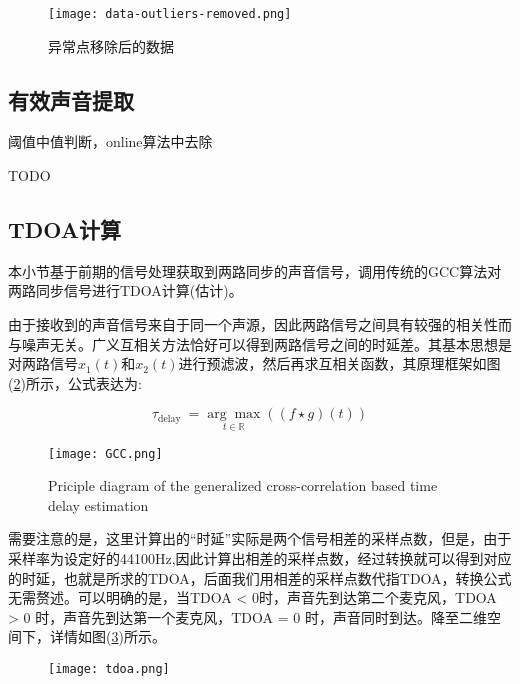 \documentclass[winfonts]{njuthesis}
\begin{document}
			\begin{figure}[H]
				\centering
				\texttt{[image: data-outliers-removed.png]} 
				\caption{异常点移除后的数据}
				\label{fig: data-outliers-removed}
			\end{figure}
		
		\subsection{有效声音提取}
		
			阈值中值判断，online算法中去除 
		
			TODO
		
		\subsection{TDOA计算}
			
			本小节基于前期的信号处理获取到两路同步的声音信号，调用传统的GCC算法对两路同步信号进行TDOA计算(估计)。
			
			由于接收到的声音信号来自于同一个声源，因此两路信号之间具有较强的相关性而与噪声无关。广义互相关方法恰好可以得到两路信号之间的时延差。其基本思想是对两路信号$x_1(t)$和$x_2(t)$进行预滤波，然后再求互相关函数，其原理框架如图(\ref{fig: GCC})所示，公式表达为:
			
			\begin{equation}
				\tau_{\text {delay }}=\underset{t \in \mathbb{R}}{\arg \max }((f \star g)(t))
			\end{equation}
			
			\begin{figure}[H]
				\centering
				\texttt{[image: GCC.png]} 
				\caption{Priciple diagram of the generalized cross-correlation based time delay estimation}
				\label{fig: GCC}
			\end{figure}	
			
			需要注意的是，这里计算出的“时延”实际是两个信号相差的采样点数，但是，由于采样率为设定好的44100Hz,因此计算出相差的采样点数，经过转换就可以得到对应的时延，也就是所求的TDOA，后面我们用相差的采样点数代指TDOA，转换公式无需赘述。可以明确的是，当TDOA < 0时，声音先到达第二个麦克风，TDOA > 0 时，声音先到达第一个麦克风，TDOA = 0 时，声音同时到达。降至二维空间下，详情如图(\ref{fig: tdoa})所示。
			
			\begin{figure}[H]
				\centering
				\texttt{[image: tdoa.png]} 
				\caption{{}}
				\label{fig: tdoa}
			\end{figure}
		
\end{document}

